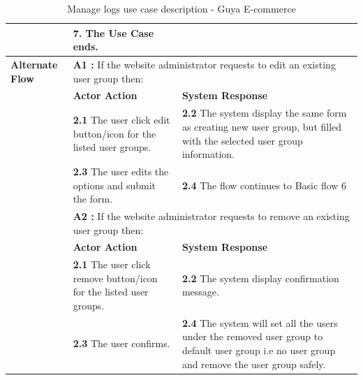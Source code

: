\begin{table}[!h]
\begin{tabular}{|l|p{6cm}|p{6cm}|}
& 
\textbf{7.}  The Use Case ends. 
\\
\hline 
\rule[-1ex]{0pt}{2.5ex} \textbf{Alternate Flow} & \multicolumn{2}{p{10cm}|}{\textbf{A1 : } If the website administrator requests to edit an existing user group then:}  \\ 
\cline{2-3}
\multirow{2}{*}{} & \textbf{Actor Action} & \textbf{System Response}\\
\cline{2-3}
%
&
\textbf{2.1}  The user click edit button/icon for the listed user groups. 
& 
\textbf{2.2}  The system display the same form as creating new user group, but filled with the selected user group information. 
\\
%
&
\textbf{2.3}  The user edits the options and submit the form. 
& 
\textbf{2.4}  The flow continues to Basic flow 6  
\\
\cline{2-3}
\rule[-1ex]{0pt}{2.5ex} & \multicolumn{2}{p{10cm}|}{\textbf{A2 : } If the website administrator requests to remove an existing user group then:}  \\ 
\cline{2-3}
\multirow{2}{*}{} & \textbf{Actor Action} & \textbf{System Response}\\
\cline{2-3}
%
&
\textbf{2.1}  The user click remove button/icon for the listed user groups. 
& 
\textbf{2.2}  The system display confirmation message. 
\\
%
&
\textbf{2.3}  The user confirms. 
& 
\textbf{2.4}  The system will set all the users under the removed user group to default user group i.e no user group and remove the user group safely.
\\
\hline
\end{tabular}
\caption{Manage logs use case description - Guya E-commerce} 
\end{table}


